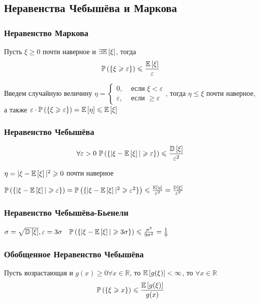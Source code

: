 \documentclass[a4paper, 10pt]{article}
\begin{document}
\subsection{Неравенства Чебышёва и Маркова}
\subsubsection*{Неравенство Маркова}
Пусть $\xi\geqslant0$ почти наверное и $\exists \mathbb{E}\left[\xi\right]$, тогда 
\begin{equation*}
    \mathbb{P}\left(\{\xi\geqslant\varepsilon\}\right)\leqslant\frac{\mathbb{E}\left[\xi\right]}{\varepsilon}
\end{equation*}

\proof Введем случайную величину $\eta=\begin{cases}
    0,&\text{ если }\xi<\varepsilon\\
    \varepsilon,&\text{ если }\geqslant\varepsilon
\end{cases}$, тогда $\eta\leqslant\xi$ почти наверное, а также $\varepsilon\cdot\mathbb{P}\left(\{\xi\geqslant\varepsilon\}\right)=\mathbb{E}\left[\eta\right]\leqslant\mathbb{E}\left[\xi\right]$

\subsubsection*{Неравенство Чебышёва}
\begin{equation*}
    \forall\varepsilon>0\ \prob{|\xi-\matwait{\xi}|\geqslant\varepsilon}\leqslant\frac{\dispersia{\xi}}{\varepsilon^2}
\end{equation*}

\proof $\eta=|\xi-\mathbb{E}\left[\xi\right]|^2\geqslant0$ почти наверное

$\mathbb{P}\left(\{|\xi-\mathbb{E}\left[\xi\right]|\geqslant\varepsilon\}\right)=\mathbb{P}\left(\{|\xi-\mathbb{E}\left[\xi\right]|^2\geqslant\varepsilon^2\}\right)\leqslant\frac{\mathbb{E}\left[\eta\right]}{\varepsilon^2}=\frac{\mathbb{D}\left[\xi\right]}{\varepsilon^2}$

\subsubsection*{Неравенство Чебышёва-Бьенели}
$\sigma=\sqrt{\mathbb{D}\left[\xi\right]},\varepsilon=3\sigma\quad\mathbb{P}\left(\{|\xi-\mathbb{E}\left[\xi\right]|\geqslant 3\sigma\}\right)\leqslant\frac{\sigma^2}{9\sigma^2}=\frac{1}{9}$

\subsubsection*{Обобщенное Неравенство Чебышёва}
Пусть  возрастающая и $g(x)\geqslant0\forall x\in\mathbb{R}$, то $\mathbb{E}\left[g(\xi)\right]<\infty$,  то $\forall x\in\mathbb{R}$
\begin{equation*}
    \mathbb{P}\left(\{\xi\geqslant x\}\right)\leqslant\frac{\mathbb{E}\left[g(\xi)\right]}{g(x)}
\end{equation*}   
\end{document}
